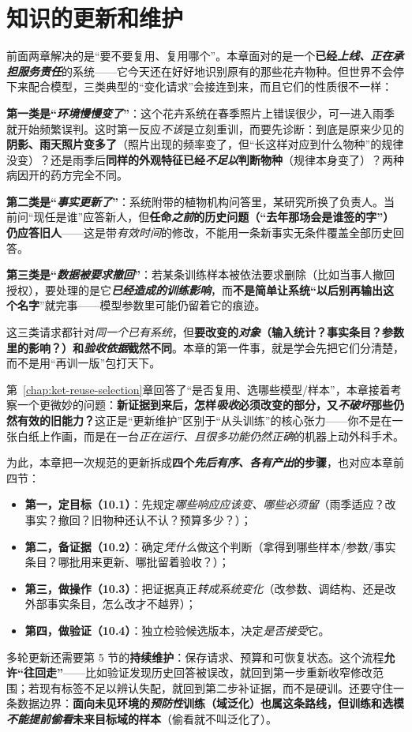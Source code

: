 \chapter{知识的更新和维护}
\label{chap:ket-update-maintenance}

前面两章解决的是“要不要复用、复用哪个”。本章面对的是一个\textbf{已经\emph{上线、正在承担服务责任}}的系统——它今天还在好好地识别原有的那些花卉物种。但世界不会停下来配合模型，三类典型的“变化请求”会接连到来，而且它们的性质很不一样：

\textbf{第一类是“\emph{环境慢慢变了}”}：这个花卉系统在春季照片上错误很少，可一进入雨季就开始频繁误判。这时第一反应\emph{不该}是立刻重训，而要先诊断：到底是原来少见的\textbf{阴影、雨天照片变多了}（照片出现的频率变了，但“长这样对应到什么物种”的规律没变）？还是雨季后\textbf{同样的外观特征已经\emph{不足以}判断物种}（规律本身变了）？两种病因开的药方完全不同。

\textbf{第二类是“\emph{事实更新了}”}：系统附带的植物机构问答里，某研究所换了负责人。当前问“现任是谁”应答新人，但\textbf{任命\emph{之前}的历史问题（“去年那场会是谁签的字”）仍应答旧人}——这是带\emph{有效时间}的修改，不能用一条新事实无条件覆盖全部历史回答。

\textbf{第三类是“\emph{数据被要求撤回}”}：若某条训练样本被依法要求删除（比如当事人撤回授权），要处理的是它\textbf{\emph{已经造成的训练影响}}，而\textbf{不是简单让系统“以后别再输出这个名字}”就完事——模型参数里可能仍留着它的痕迹。

这三类请求都针对\emph{同一个已有系统}，但\textbf{要改变的\emph{对象}（输入统计？事实条目？参数里的影响？）和\emph{验收依据}截然不同}。本章的第一件事，就是学会先把它们分清楚，而不是用“再训一版”包打天下。

第~\ref{chap:ket-reuse-selection}章回答了“是否复用、选哪些模型/样本”，本章接着考察一个更微妙的问题：\textbf{新证据到来后，怎样\emph{吸收}必须改变的部分，又\emph{不破坏}那些仍然有效的旧能力？}这正是“更新维护”区别于“从头训练”的核心张力——你不是在一张白纸上作画，而是在一台\emph{正在运行、且很多功能仍然正确}的机器上动外科手术。

为此，本章把一次规范的更新拆成\textbf{四个\emph{先后有序、各有产出}的步骤}，也对应本章前四节：
\begin{itemize}\item \textbf{第一，定目标（10.1）}：先规定\emph{哪些响应应该变、哪些必须留}（雨季适应？改事实？撤回？旧物种还认不认？预算多少？）；\item \textbf{第二，备证据（10.2）}：确定\emph{凭什么}做这个判断（拿得到哪些样本/参数/事实条目？哪批用来更新、哪批留着验收？）；\item \textbf{第三，做操作（10.3）}：把证据真正\emph{转成系统变化}（改参数、调结构、还是改外部事实条目，怎么改才不越界）；\item \textbf{第四，做验证（10.4）}：独立检验候选版本，决定\emph{是否接受}它。\end{itemize}
多轮更新还需要第 5 节的\textbf{持续维护}：保存请求、预算和可恢复状态。这个流程\textbf{允许“往回走”}——比如验证发现历史回答被误改，就回到第一步重新收窄修改范围；若现有标签不足以辨认失配，就回到第二步补证据，而不是硬训。还要守住一条数据边界：\textbf{面向未见环境的\emph{预防性}训练（域泛化）也属这条路线，但训练和选模\emph{不能提前偷看}未来目标域的样本}（偷看就不叫泛化了）。

